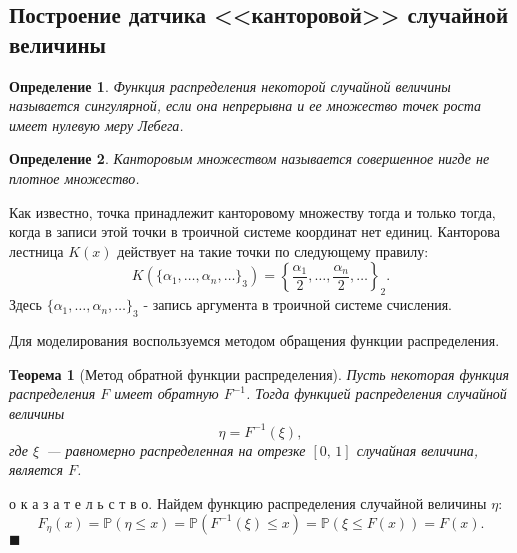 \documentclass[a4paper, 11pt]{article}
\theoremstyle{def}
\newtheorem{definition}{Определение}[section]
\theoremstyle{th}
\newtheorem{theorem}{Теорема}[section]
\theoremstyle{rem}
\renewenvironment{proof}{\parД о к а з а т е л ь с т в о.}{\hfill$\blacksquare$}
\newcommand{\p}{\mathbb{P}}
\begin{document}
\subsection{Построение датчика <<канторовой>> случайной величины}

\begin{definition}
        Функция распределения некоторой случайной величины называется \textit{сингулярной}, если она непрерывна и ее множество точек роста имеет нулевую меру Лебега.
\end{definition}
\begin{definition}
        \textit{Канторовым множеством} называется совершенное нигде не плотное множество. 
\end{definition}
Как известно, точка принадлежит канторовому множеству тогда и только тогда, когда в записи этой точки в троичной системе координат нет единиц. Канторова лестница $K(x)$ действует на такие точки по следующему правилу:
$$
K(\{\alpha_1, \ldots, \alpha_n, \ldots\}_3) = \left\{\frac{\alpha_1}{2}, \ldots, \frac{\alpha_n}{2}, \ldots\right\}_2.
$$
Здесь $\{\alpha_1, \ldots, \alpha_n, \ldots\}_3$ - запись аргумента в троичной системе счисления.

Для моделирования воспользуемся методом обращения функции распределения.
\begin{theorem}[Метод обратной функции распределения]
\label{th:inv-method}
        Пусть некоторая функция распределения $F$ имеет обратную $F^{-1}$. Тогда функцией распределения случайной величины
        $$
                \eta = F^{-1}(\xi),
        $$
        где $\xi$~--- равномерно распределенная на отрезке $[0,\,1]$ случайная величина, является $F$.
\end{theorem}
\begin{proof}
        Найдем функцию распределения случайной величины $\eta$:
        $$
                F_\eta(x) =
                \p(\eta \leqslant x) =
                \p(F^{-1}(\xi) \leqslant x) =
                \p(\xi \leqslant F(x)) =
                F(x).
        $$
\end{proof}
\end{document}
